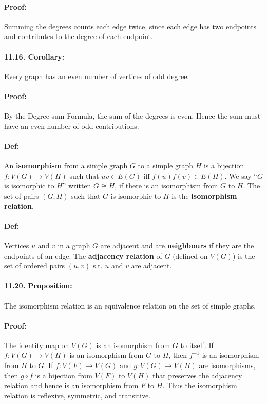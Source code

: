 \documentclass[a4paper, 11pt, twoside]{article}
\begin{document}
\paragraph{Proof:} Summing the degrees counts each edge twice, since each edge has two endpoints and contributes to the degree of each endpoint.

\paragraph{11.16. Corollary:} Every graph has an even number of vertices of odd degree.

\paragraph{Proof:} By the Degree-sum Formula, the sum of the degrees is even. Hence the sum must have an even number of odd contributions.

\paragraph{Def:} An \textbf{isomorphism} from a simple graph $G$ to a simple graph $H$ is a bijection $f:V(G)\rightarrow V(H)$ such that $uv\in E(G)$ iff $f(u)f(v)\in E(H)$. We say ``$G$ is isomorphic to $H$'' written $G\cong H$, if there is an isomorphism from $G$ to $H$. The set of pairs $(G, H)$ such that $G$ is isomorphic to $H$ is the \textbf{isomorphism relation}.

\paragraph{Def:} Vertices $u$ and $v$ in a graph $G$ are adjacent and are \textbf{neighbours} if they are the endpoints of an edge. The \textbf{adjacency relation} of $G$ (defined on $V(G)$) is the set of ordered pairs $(u, v)$ s.t. $u$ and $v$ are adjacent.

\paragraph{11.20. Proposition:} The isomorphism relation is an equivalence relation on the set of simple graphs.

\paragraph{Proof:} The identity map on $V(G)$ is an isomorphism from $G$ to itself. If $f: V(G)\rightarrow V(H)$ is an isomorphism from $G$ to $H$, then $f^{-1}$ is an isomorphism from $H$ to $G$. If $f: V(F)\rightarrow V(G)$ and $g:V(G)\rightarrow V(H)$ are isomorphisms, then $g\circ f$ is a bijection from $V(F)$ to $V(H)$ that preserves the adjacency relation and hence is an isomorphism from $F$ to $H$. Thus the isomorphism relation is reflexive, symmetric, and transitive.
\end{document}
